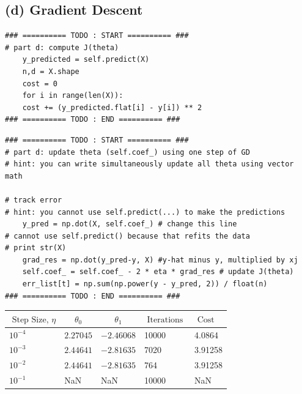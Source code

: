 \documentclass[11pt]{article}
\newcommand{\sol}[1]{{\bf{\color{magenta}{{Solution:}}}}}
\begin{document}
\subsection{(d) Gradient Descent}
\sol x 
\begin{lstlisting}
### ========== TODO : START ========== ###
# part d: compute J(theta)
    y_predicted = self.predict(X)
    n,d = X.shape
    cost = 0
    for i in range(len(X)):
    cost += (y_predicted.flat[i] - y[i]) ** 2
### ========== TODO : END ========== ###
\end{lstlisting}

\begin{lstlisting}
### ========== TODO : START ========== ###
# part d: update theta (self.coef_) using one step of GD
# hint: you can write simultaneously update all theta using vector math
                
# track error
# hint: you cannot use self.predict(...) to make the predictions
    y_pred = np.dot(X, self.coef_) # change this line
# cannot use self.predict() because that refits the data
# print str(X)
    grad_res = np.dot(y_pred-y, X) #y-hat minus y, multiplied by xj
    self.coef_ = self.coef_ - 2 * eta * grad_res # update J(theta)
    err_list[t] = np.sum(np.power(y - y_pred, 2)) / float(n)                 
### ========== TODO : END ========== ###
\end{lstlisting}

\begin{center}
\begin{tabular}{|l|l|l|l|l|}
\hline${\text { Step Size, } \eta}$ & \multicolumn{1}{|c|}{${\theta_{0}}$} & \multicolumn{1}{c|}{${\theta}_{1}$} & ${\text { Iterations }}$ & ${\text { Cost }}$ \\
\hline $10^{-4}$ & $2.27045$ & $-2.46068$ & 10000 & 4.0864 \\
\hline $10^{-3}$ & $2.44641$ & $-2.81635$ & 7020 & 3.91258 \\
\hline $10^{-2}$ & $2.44641$ & $-2.81635$ & 764 & 3.91258 \\
\hline $10^{-1}$ & NaN & NaN & 10000 & NaN \\
\hline
\end{tabular}
\end{center}
\end{document}

